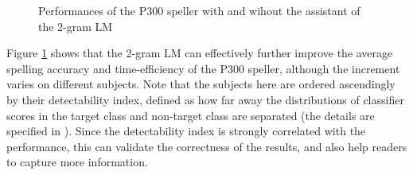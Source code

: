 \documentclass{article}
\begin{document}
\vspace{-3mm}
\begin{figure}[H]
	\centering
	\qquad
	\hspace{-8mm}
	\caption{Performances of the P300 speller with and wihout the assistant of the 2-gram LM}
	\label{fig:10}
\end{figure}

\vspace{-3mm}
Figure \ref{fig:10} shows that the 2-gram LM can effectively further improve the average spelling accuracy and time-efficiency of the P300 speller, although the increment varies on different subjects. Note that the subjects here are ordered ascendingly by their detectability index, defined as how far away the distributions of classifier scores in the target class and non-target class are separated (the details are specified in \cite{mainsah2016using}). Since the detectability index is strongly correlated with the performance, this can validate the correctness of the results, and also help readers to capture more information.
\end{document}
